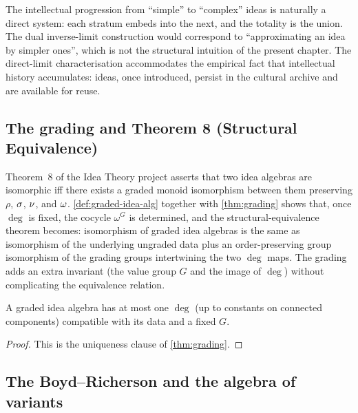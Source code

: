 \begin{remark}
The intellectual progression from ``simple'' to ``complex'' ideas is
naturally a direct system: each stratum embeds into the next, and the
totality is the union. The dual inverse-limit construction would
correspond to ``approximating an idea by simpler ones'', which is not
the structural intuition of the present chapter. The direct-limit
characterisation accommodates the empirical fact that intellectual
history accumulates: ideas, once introduced, persist in the cultural
archive and are available for reuse.
\end{remark}

\subsection*{The grading and Theorem 8 (Structural Equivalence)}

Theorem~8 of the Idea Theory project asserts that two idea algebras
are isomorphic iff there exists a graded monoid isomorphism between
them preserving $\rho$, $\sigma$, $\nu$, and $\omega$.
\cref{def:graded-idea-alg} together with \cref{thm:grading}
shows that, once $\deg$ is fixed, the cocycle $\omega^G$ is
determined, and the structural-equivalence theorem becomes:
isomorphism of graded idea algebras is the same as isomorphism of the
underlying ungraded data plus an order-preserving group isomorphism
of the grading groups intertwining the two $\deg$ maps. The grading
adds an extra invariant (the value group $G$ and the image of $\deg$)
without complicating the equivalence relation.

\begin{corollary}\label{cor:grading-rigidity}
A graded idea algebra has at most one $\deg$ (up to constants on
connected components) compatible with its data and a fixed $G$.
\end{corollary}

\begin{proof}
This is the uniqueness clause of \cref{thm:grading}.
\end{proof}

\subsection*{The Boyd--Richerson and the algebra of variants}

